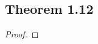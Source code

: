 \documentclass[../../main.tex]{subfiles}
\begin{document}
\subsection{Theorem 1.12}
\begin{wts}

\end{wts}
\begin{proof}

\end{proof}
\end{document}

